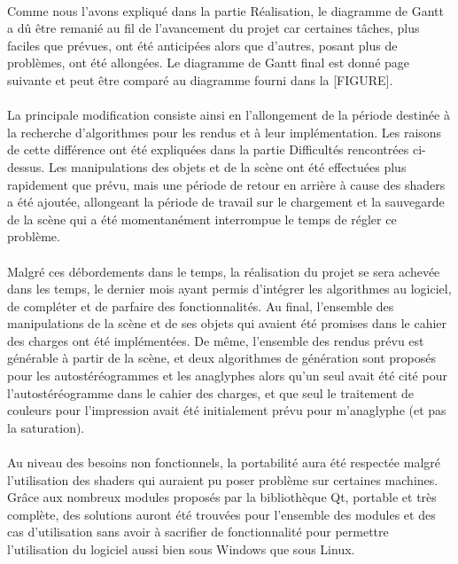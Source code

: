\paragraph{}
Comme nous l'avons expliqué dans la partie Réalisation, le diagramme de Gantt a dû être remanié au fil de l'avancement du projet car certaines tâches, plus faciles que prévues, ont été anticipées alors que d'autres, posant plus de problèmes, ont été allongées.
Le diagramme de Gantt final est donné page suivante et peut être comparé au diagramme fourni dans la [FIGURE].

\newpage

\newpage

\paragraph{}
La principale modification consiste ainsi en l'allongement de la période destinée à la recherche d'algorithmes pour les rendus et à leur implémentation. Les raisons de cette différence ont été expliquées dans la partie Difficultés rencontrées ci-dessus.
Les manipulations des objets et de la scène ont été effectuées plus rapidement que prévu, mais une période de retour en arrière à cause des shaders a été ajoutée, allongeant la période de travail sur le chargement et la sauvegarde de la scène qui a été momentanément interrompue le temps de régler ce problème.

\paragraph{}
Malgré ces débordements dans le temps, la réalisation du projet se sera achevée dans les temps, le dernier mois ayant permis d'intégrer les algorithmes au logiciel, de compléter et de parfaire des fonctionnalités.
Au final, l'ensemble des manipulations de la scène et de ses objets qui avaient été promises dans le cahier des charges ont été implémentées. De même, l'ensemble des rendus prévu est générable à partir de la scène, et deux algorithmes de génération sont proposés pour les autostéréogrammes et les anaglyphes alors qu'un seul avait été cité pour l'autostéréogramme dans le cahier des charges, et que seul le traitement de couleurs pour l'impression avait été initialement prévu pour m'anaglyphe (et pas la saturation).

\paragraph{}
Au niveau des besoins non fonctionnels, la portabilité aura été respectée malgré l'utilisation des shaders qui auraient pu poser problème sur certaines machines. Grâce aux nombreux modules proposés par la bibliothèque Qt, portable et très complète, des solutions auront été trouvées pour l'ensemble des modules et des cas d'utilisation sans avoir à sacrifier de fonctionnalité pour permettre l'utilisation du logiciel aussi bien sous Windows que sous Linux.

